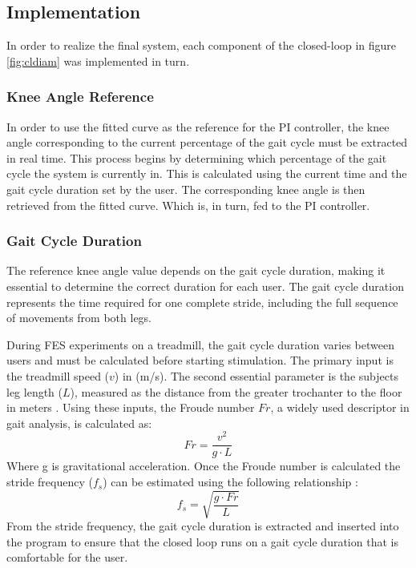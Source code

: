 \subsection{Implementation}
In order to realize the final system, each component of the closed-loop in figure \ref{fig:cldiam} was implemented in turn.
\subsubsection{Knee Angle Reference}
In order to use the fitted curve as the reference for the PI controller, the knee angle corresponding to the current percentage of the gait cycle must be extracted in real time. This process begins by determining which percentage of the gait cycle the system is currently in. This is calculated using the current time and the gait cycle duration set by the user. The corresponding knee angle is then retrieved from the fitted curve. Which is, in turn, fed to the PI controller.

\subsubsection{Gait Cycle Duration}
The reference knee angle value depends on the gait cycle duration, making it essential to determine the correct duration for each user. The gait cycle duration represents the time required for one complete stride, including the full sequence of movements from both legs.

During FES experiments on a treadmill, the gait cycle duration varies between users and must be calculated before starting stimulation. The primary input is the treadmill speed (\(v\)) in (m/s). The second essential parameter is the subjects leg length (\(L\)), measured as the distance from the greater trochanter to the floor in meters \cite{meinders_how_2021}. Using these inputs, the Froude number \(Fr\), a widely used descriptor in gait analysis, is calculated as:
\begin{equation}
    Fr = \frac{v^2}{g \cdot L}
\end{equation}
Where g is gravitational acceleration. Once the Froude number is calculated the stride frequency (\(f_s\)) can be estimated using the following relationship \cite{meinders_how_2021}:
\begin{equation}
    f_s = \sqrt{\frac{g \cdot Fr}{L}}
\end{equation}
From the stride frequency, the gait cycle duration is extracted and inserted into the program to ensure that the closed loop runs on a gait cycle duration that is comfortable for the user.

